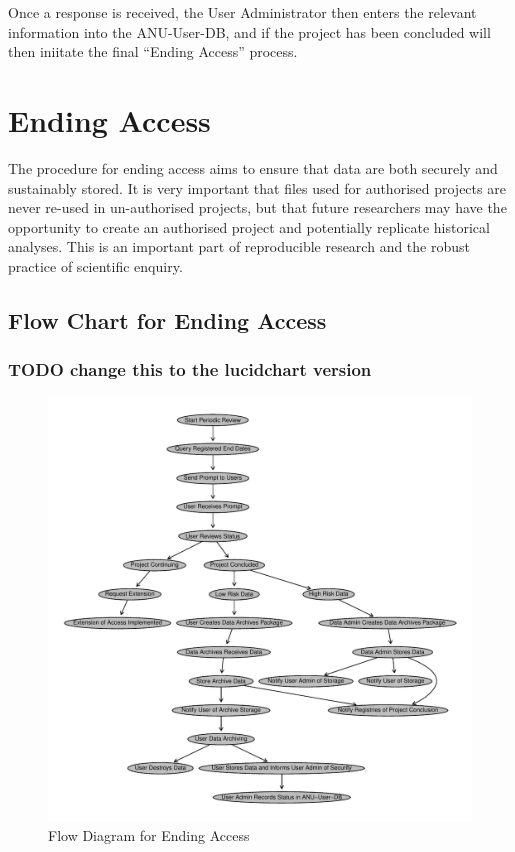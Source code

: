 \documentclass[a4paper]{article}
\begin{document}
Once a response is received, the User Administrator then enters the relevant information into the ANU-User-DB, and if the project has been concluded will then iniitate the final ``Ending Access'' process.
\section{Ending Access}
\label{sec-4}

The procedure for ending access aims to ensure that data are both securely and sustainably stored.  It is very important that files used for authorised projects are never re-used in un-authorised projects, but that future researchers may have the opportunity to create an authorised project and potentially replicate historical analyses.  This is an important part of reproducible research and the robust practice of scientific enquiry.
\subsection{Flow Chart for Ending Access}
\label{sec-4-1}
\subsubsection{\textbf{TODO} change this to the lucidchart version}
\label{sec-4-1-1}


\begin{figure}[!h]
\centering
\includegraphics[width=\textwidth]{DataAccessFlowDiagram-EndAccess.pdf}
\caption{Flow Diagram for Ending Access}
\label{fig:DataAccessFlowDiagram-EndAccess}
\end{figure}
\clearpage
\end{document}
